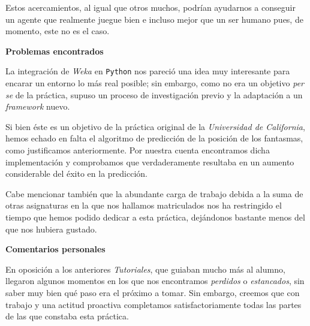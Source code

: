 \documentclass[12pt]{article}
\begin{document}
Estos acercamientos, al igual que otros muchos, podrían ayudarnos a conseguir un agente que realmente juegue bien e incluso mejor que un ser humano pues, de momento, este no es el caso.

\vspace{0.2cm}

\centerline{\textbf{Problemas encontrados}}

\vspace{0.5cm}

La integración de \emph{Weka} en \texttt{Python} nos pareció una idea muy interesante para encarar un entorno lo más real posible; sin embargo, como no era un objetivo \emph{per se} de la práctica, supuso un proceso de investigación previo y la adaptación a un \emph{framework} nuevo.

Si bien éste es un objetivo de la práctica original de la \emph{Universidad de California}, hemos echado en falta el algoritmo de predicción de la posición de los fantasmas, como justificamos anteriormente. Por nuestra cuenta encontramos dicha implementación y comprobamos que verdaderamente resultaba en un aumento considerable del éxito en la predicción.

Cabe mencionar también que la abundante carga de trabajo debida a la suma de otras asignaturas en la que nos hallamos matriculados nos ha restringido el tiempo que hemos podido dedicar a esta práctica, dejándonos bastante menos del que nos hubiera gustado.

\vspace{0.5cm}

\centerline{\textbf{Comentarios personales}}

\vspace{0.5cm}

En oposición a los anteriores \emph{Tutoriales}, que guiaban mucho más al alumno, llegaron algunos momentos en los que nos encontramos \emph{perdidos} o \emph{estancados}, sin saber muy bien qué paso era el próximo a tomar. Sin embargo, creemos que con trabajo y una actitud proactiva completamos satisfactoriamente todas las partes de las que constaba esta práctica.
\end{document}
